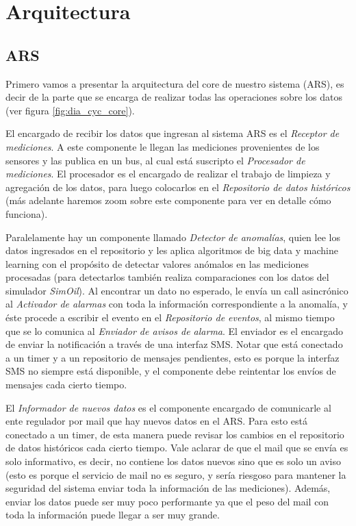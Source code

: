 \section{Arquitectura}

\subsection{ARS}

\par Primero vamos a presentar la arquitectura del core de nuestro sistema (ARS), es decir de la parte que se encarga de realizar todas las operaciones sobre los datos (ver figura \ref{fig:dia_cyc_core}). \\

\par El encargado de recibir los datos que ingresan al sistema ARS es el \textit{Receptor de mediciones}. A este componente le llegan las mediciones provenientes de los sensores y las publica en un bus, al cual está suscripto el \textit{Procesador de mediciones}. El procesador es el encargado de realizar el trabajo de limpieza y agregación de los datos, para luego colocarlos en el \textit{Repositorio de datos históricos} (más adelante haremos zoom sobre este componente para ver en detalle cómo funciona). \\

\par Paralelamente hay un componente llamado \textit{Detector de anomalías}, quien lee los datos ingresados en el repositorio y les aplica algoritmos de big data y machine learning con el propósito de detectar valores anómalos en las mediciones procesadas (para detectarlos también realiza comparaciones con los datos del simulador \textit{SimOil}). Al encontrar un dato no esperado, le envía un call asincrónico al \textit{Activador de alarmas} con toda la información correspondiente a la anomalía, y éste procede a escribir el evento en el \textit{Repositorio de eventos}, al mismo tiempo que se lo comunica al \textit{Enviador de avisos de alarma}. El enviador es el encargado de enviar la notificación a través de una interfaz SMS. Notar que está conectado a un timer y a un repositorio de mensajes pendientes, esto es porque la interfaz SMS no siempre está disponible, y el componente debe reintentar los envíos de mensajes cada cierto tiempo. \\

\par El \textit{Informador de nuevos datos} es el componente encargado de comunicarle al ente regulador por mail que hay nuevos datos en el ARS. Para esto está conectado a un timer, de esta manera puede revisar los cambios en el repositorio de datos históricos cada cierto tiempo. Vale aclarar de que el mail que se envía es solo informativo, es decir, no contiene los datos nuevos sino que es solo un aviso (esto es porque el servicio de mail no es seguro, y sería riesgoso para mantener la seguridad del sistema enviar toda la información de las mediciones). Además, enviar los datos puede ser muy poco performante ya que el peso del mail con toda la información puede llegar a ser muy grande. \\

